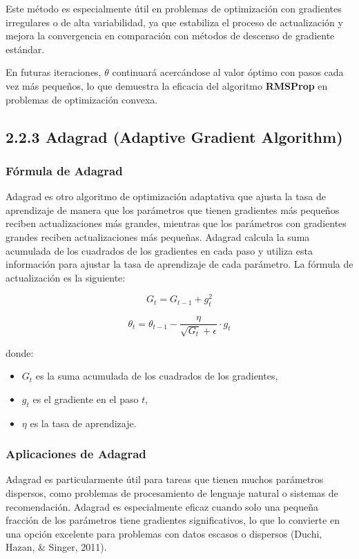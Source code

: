 \documentclass{article}
\begin{document}
Este método es especialmente útil en problemas de optimización con gradientes irregulares o de alta variabilidad, ya que estabiliza el proceso de actualización y mejora la convergencia en comparación con métodos de descenso de gradiente estándar.

En futuras iteraciones, \( \theta \) continuará acercándose al valor óptimo con pasos cada vez más pequeños, lo que demuestra la eficacia del algoritmo \textbf{RMSProp} en problemas de optimización convexa.

\subsection*{2.2.3 Adagrad (Adaptive Gradient Algorithm)}

\subsubsection*{Fórmula de Adagrad}

Adagrad es otro algoritmo de optimización adaptativa que ajusta la tasa de aprendizaje de manera que los parámetros que tienen gradientes más pequeños reciben actualizaciones más grandes, mientras que los parámetros con gradientes grandes reciben actualizaciones más pequeñas. Adagrad calcula la suma acumulada de los cuadrados de los gradientes en cada paso y utiliza esta información para ajustar la tasa de aprendizaje de cada parámetro. La fórmula de actualización es la siguiente:

\[
G_t = G_{t-1} + g_t^2
\]

\[
\theta_t = \theta_{t-1} - \frac{\eta}{\sqrt{G_t} + \epsilon} \cdot g_t
\]

donde:
\begin{itemize}
	\item \( G_t \) es la suma acumulada de los cuadrados de los gradientes,
	\item \( g_t \) es el gradiente en el paso \( t \),
	\item \( \eta \) es la tasa de aprendizaje.
\end{itemize}

\subsubsection*{Aplicaciones de Adagrad}

Adagrad es particularmente útil para tareas que tienen muchos parámetros dispersos, como problemas de procesamiento de lenguaje natural o sistemas de recomendación. Adagrad es especialmente eficaz cuando solo una pequeña fracción de los parámetros tiene gradientes significativos, lo que lo convierte en una opción excelente para problemas con datos escasos o dispersos (Duchi, Hazan, \& Singer, 2011).
\end{document}
